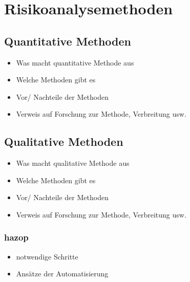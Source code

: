 \section{Risikoanalysemethoden}
\subsection{Quantitative Methoden}
\begin{itemize}
\item Was macht quantitative Methode aus
\item Welche Methoden gibt es
\item Vor/ Nachteile der Methoden
\item Verweis auf Forschung zur Methode, Verbreitung usw.
\end{itemize}
\subsection{Qualitative Methoden}
\begin{itemize}
\item Was macht qualitative Methode aus
\item Welche Methoden gibt es
\item Vor/ Nachteile der Methoden
\item Verweis auf Forschung zur Methode, Verbreitung usw.
\end{itemize}
  \subsubsection{\ac{hazop}}
  \begin{itemize}
  \item notwendige Schritte
  \item Ans\"atze der Automatisierung
  \end{itemize}
